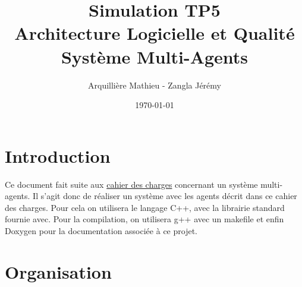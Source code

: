 \documentclass{article}
\title{Simulation TP5\\Architecture Logicielle et Qualité\\Système Multi-Agents}
\author{Arquillière Mathieu - Zangla Jérémy}
\date{\today}
\newcommand{\changeurlcolor}[1]{\hypersetup{urlcolor=#1}}
\begin{document}
\begin{titlepage}
  \maketitle
\end{titlepage}

\tableofcontents
\listoffigures
\newpage



\section{Introduction}
Ce document fait suite aux \changeurlcolor{blue}\href{run:../CahierDesCharges/cahier.pdf}{cahier des charges} concernant
un système multi-agents. Il s'agit donc de réaliser un système avec les agents décrit dans ce cahier des charges.
Pour cela on utilisera le langage C++, avec la librairie standard fournie avec. Pour la compilation, on utilisera g++
avec un makefile et enfin Doxygen pour la documentation associée à ce projet.



\section{Organisation}
\end{document}
